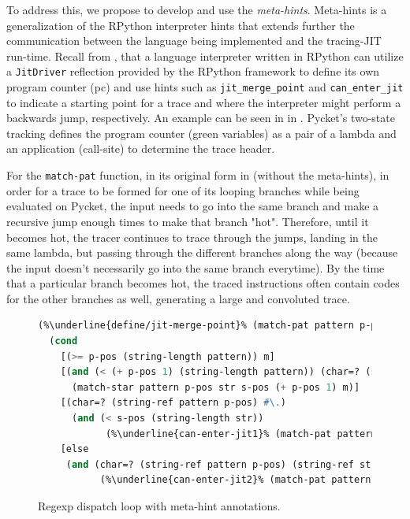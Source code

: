 To address this, we propose to develop and use the
\emph{meta-hints}. Meta-hints is a generalization of the RPython
interpreter hints that extends further the communication between the
language being implemented and the tracing-JIT run-time. Recall from
, that a language interpreter written in
RPython can utilize a \verb|JitDriver| reflection provided by the
RPython framework to define its own program counter (pc) and use hints
such as \verb|jit_merge_point| and \verb|can_enter_jit| to indicate a
starting point for a trace and where the interpreter might perform a
backwards jump, respectively. An example can be seen in
 in . Pycket's
two-state tracking defines the program counter (green variables) as a
pair of a lambda and an application (call-site) to determine the trace
header.

For the \verb|match-pat| function, in its original form in
 (without the meta-hints), in order for a trace to
be formed for one of its looping branches while being evaluated on
Pycket, the input needs to go into the same branch and make a
recursive jump enough times to make that branch "hot". Therefore,
until it becomes hot, the tracer continues to trace through the jumps,
landing in the same lambda, but passing through the different branches
along the way (because the input doesn't necessarily go into the same
branch everytime). By the time that a particular branch becomes hot,
the traced instructions often contain codes for the other branches as
well, generating a large and convoluted trace.

\begin{figure}[h!]
  \footnotesize
  \begin{mdframed}
\begin{lstlisting}[mathescape,escapechar=\%,language=lisp]
(%\underline{define/jit-merge-point}% (match-pat pattern p-pos str s-pos m) %\underline{\#:greens pattern}%
  (cond
    [(>= p-pos (string-length pattern)) m]
    [(and (< (+ p-pos 1) (string-length pattern)) (char=? (string-ref pattern (+ p-pos 1)) #\*))
      (match-star pattern p-pos str s-pos (+ p-pos 1) m)]
    [(char=? (string-ref pattern p-pos) #\.)
      (and (< s-pos (string-length str))
            (%\underline{can-enter-jit1}% (match-pat pattern (add1 p-pos) str (add1 s-pos) (cons (string-ref str s-pos) m))))]
    [else
     (and (char=? (string-ref pattern p-pos) (string-ref str s-pos))
           (%\underline{can-enter-jit2}% (match-pat pattern (add1 p-pos) str (add1 s-pos) (cons (string-ref str s-pos) m))))]))
\end{lstlisting}
\end{mdframed}
\caption{Regexp dispatch loop with meta-hint annotations.}
\label{fig:annotated-regexp}
\end{figure}

